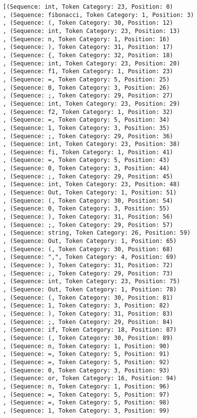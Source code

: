 \documentclass[a4paper, 12pt, article]{memoir}
\begin{document}
\begin{lstlisting}
[(Sequence: int, Token Category: 23, Position: 0)
, (Sequence: fibonacci, Token Category: 1, Position: 3)
, (Sequence: (, Token Category: 30, Position: 12)
, (Sequence: int, Token Category: 23, Position: 13)
, (Sequence: n, Token Category: 1, Position: 16)
, (Sequence: ), Token Category: 31, Position: 17)
, (Sequence: {, Token Category: 32, Position: 18)
, (Sequence: int, Token Category: 23, Position: 20)
, (Sequence: f1, Token Category: 1, Position: 23)
, (Sequence: =, Token Category: 5, Position: 25)
, (Sequence: 0, Token Category: 3, Position: 26)
, (Sequence: ;, Token Category: 29, Position: 27)
, (Sequence: int, Token Category: 23, Position: 29)
, (Sequence: f2, Token Category: 1, Position: 32)
, (Sequence: =, Token Category: 5, Position: 34)
, (Sequence: 1, Token Category: 3, Position: 35)
, (Sequence: ;, Token Category: 29, Position: 36)
, (Sequence: int, Token Category: 23, Position: 38)
, (Sequence: fi, Token Category: 1, Position: 41)
, (Sequence: =, Token Category: 5, Position: 43)
, (Sequence: 0, Token Category: 3, Position: 44)
, (Sequence: ;, Token Category: 29, Position: 45)
, (Sequence: int, Token Category: 23, Position: 48)
, (Sequence: Out, Token Category: 1, Position: 51)
, (Sequence: (, Token Category: 30, Position: 54)
, (Sequence: 0, Token Category: 3, Position: 55)
, (Sequence: ), Token Category: 31, Position: 56)
, (Sequence: ;, Token Category: 29, Position: 57)
, (Sequence: string, Token Category: 26, Position: 59)
, (Sequence: Out, Token Category: 1, Position: 65)
, (Sequence: (, Token Category: 30, Position: 68)
, (Sequence: ",", Token Category: 4, Position: 69)
, (Sequence: ), Token Category: 31, Position: 72)
, (Sequence: ;, Token Category: 29, Position: 73)
, (Sequence: int, Token Category: 23, Position: 75)
, (Sequence: Out, Token Category: 1, Position: 78)
, (Sequence: (, Token Category: 30, Position: 81)
, (Sequence: 1, Token Category: 3, Position: 82)
, (Sequence: ), Token Category: 31, Position: 83)
, (Sequence: ;, Token Category: 29, Position: 84)
, (Sequence: if, Token Category: 18, Position: 87)
, (Sequence: (, Token Category: 30, Position: 89)
, (Sequence: n, Token Category: 1, Position: 90)
, (Sequence: =, Token Category: 5, Position: 91)
, (Sequence: =, Token Category: 5, Position: 92)
, (Sequence: 0, Token Category: 3, Position: 93)
, (Sequence: or, Token Category: 16, Position: 94)
, (Sequence: n, Token Category: 1, Position: 96)
, (Sequence: =, Token Category: 5, Position: 97)
, (Sequence: =, Token Category: 5, Position: 98)
, (Sequence: 1, Token Category: 3, Position: 99)

\end{lstlisting}
\end{document}
